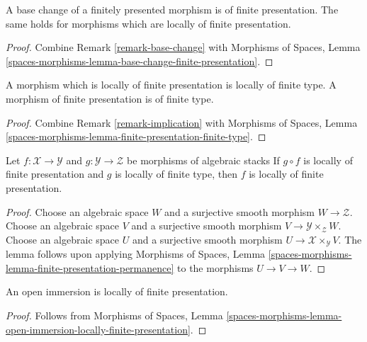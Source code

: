 \begin{lemma}
\label{lemma-base-change-finite-presentation}
A base change of a finitely presented morphism is of finite presentation.
The same holds for morphisms which are locally of finite presentation.
\end{lemma}

\begin{proof}
Combine
Remark \ref{remark-base-change}
with
Morphisms of Spaces, Lemma
\ref{spaces-morphisms-lemma-base-change-finite-presentation}.
\end{proof}

\begin{lemma}
\label{lemma-finite-presentation-finite-type}
A morphism which is locally of finite presentation is locally of finite type.
A morphism of finite presentation is of finite type.
\end{lemma}

\begin{proof}
Combine
Remark \ref{remark-implication}
with
Morphisms of Spaces, Lemma
\ref{spaces-morphisms-lemma-finite-presentation-finite-type}.
\end{proof}

\begin{lemma}
\label{lemma-finite-presentation-permanence}
Let $f : \mathcal{X} \to \mathcal{Y}$ and
$g : \mathcal{Y} \to \mathcal{Z}$ be morphisms of algebraic stacks
If $g \circ f$ is locally of finite presentation and $g$ is locally of
finite type, then $f$ is locally of finite presentation.
\end{lemma}

\begin{proof}
Choose an algebraic space $W$ and a surjective smooth morphism
$W \to \mathcal{Z}$.
Choose an algebraic space $V$ and a surjective smooth morphism
$V \to \mathcal{Y} \times_\mathcal{Z} W$.
Choose an algebraic space $U$ and a surjective smooth morphism
$U \to \mathcal{X} \times_\mathcal{Y} V$.
The lemma follows upon applying
Morphisms of Spaces, Lemma
\ref{spaces-morphisms-lemma-finite-presentation-permanence}
to the morphisms $U \to V \to W$.
\end{proof}

\begin{lemma}
\label{lemma-open-immersion-locally-finite-presentation}
An open immersion is locally of finite presentation.
\end{lemma}

\begin{proof}
Follows from
Morphisms of Spaces,
Lemma \ref{spaces-morphisms-lemma-open-immersion-locally-finite-presentation}.
\end{proof}

